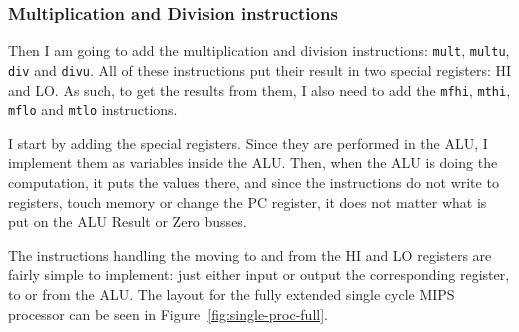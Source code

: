 \subsubsection*{Multiplication and Division instructions}
Then I am going to add the multiplication and division instructions:
\texttt{mult}, \texttt{multu}, \texttt{div} and \texttt{divu}. All of these
instructions put their result in two special registers: HI and LO. As such, to
get the results from them, I also need to add the \texttt{mfhi}, \texttt{mthi},
\texttt{mflo} and \texttt{mtlo} instructions.

I start by adding the special registers. Since they are performed in the ALU, I
implement them as variables inside the ALU. Then, when the ALU is doing the
computation, it puts the values there, and since the instructions do not write
to registers, touch memory or change the PC register, it does not matter what
is put on the ALU Result or Zero busses.

The instructions handling the moving to and from the HI and LO registers are
fairly simple to implement: just either input or output the corresponding
register, to or from the ALU. The layout for the fully extended single cycle
MIPS processor can be seen in Figure~\ref{fig:single-proc-full}.

